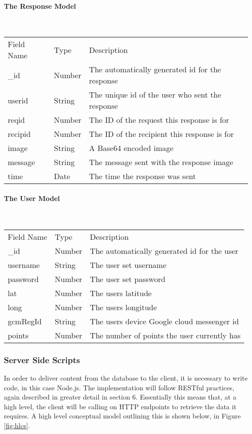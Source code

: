 \documentclass[a4paper]{article}
\newcommand{\subsubsubsection}[1]{\paragraph{#1}\mbox{}\\}
\begin{document}
\subsubsubsection{The Response Model}
\begin{table}[H]
\centering
       \begin{tabular}{lll}
    Field Name & Type   & Description                                    \\
    \_id       & Number & The automatically generated id for the response \\
    userid     & String & The unique id of the user who sent the response \\
    reqid        & Number & The ID of the request this response is for    \\
    recipid       & Number & The ID of the recipient this response is for  \\
    image       & String   & A Base64 encoded image               \\
    message      & String & The message sent with the response image    \\
    time    & Date & The time the response was sent    \\
                                      
    \end{tabular}
\end{table}


\subsubsubsection{The User Model}
\begin{table}[H]
\centering
       \begin{tabular}{lll}
    Field Name & Type   & Description                                    \\
    \_id       & Number & The automatically generated id for the user \\
    username     & String & The user set username \\
    password       & Number & The user set password                    \\
    lat       & Number   & The users latitude                 \\
    long      & Number & The users longitude                          \\
    gcmRegId    & String & The users device Google cloud messenger id      \\
    points      & Number & The number of points the user currently has    \\                                     
    \end{tabular}
\end{table}
\subsubsection{Server Side Scripts}
In order to deliver content from the database to the client, it is necessary to write code, in this case Node.js. The implementation will follow RESTful practices, again described in greater detail in section 6. Essentially this means that, at a high level, the client will be calling on HTTP endpoints to retrieve the data it requires. A high level conceptual model outlining this is shown below, in Figure \ref{fig:hlcs}.
\end{document}
